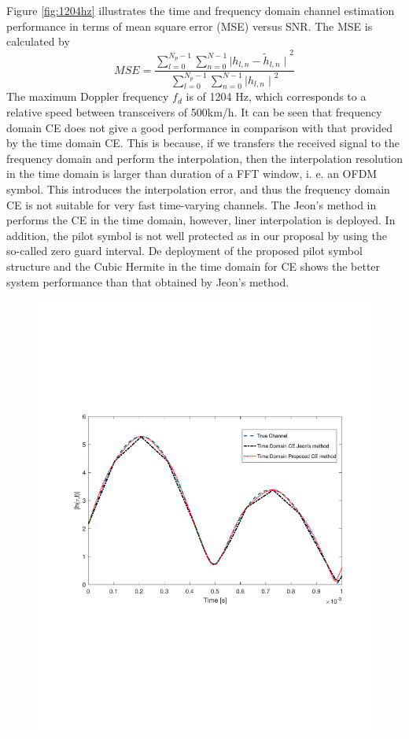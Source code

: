 \documentclass[AMA]{WileyNJD-v1}
\begin{document}
{{{Figure \ref{fig:1204hz} illustrates the time and frequency domain channel estimation performance in terms of mean square error (MSE) versus SNR. The MSE is calculated by
%
\begin{equation}\label{eq:mse-calculate}
MSE=\dfrac{\sum_{l=0}^{N_p-1}\sum_{n=0}^{N-1} {\mid h_{l,n} - \tilde{h}_{l,n}\mid}^{2} }{{\sum_{l=0}^{N_p-1}\sum_{n=0}^{N-1} {\mid h_{l,n}\mid}^{2}}}
\end{equation}
%
The maximum Doppler frequency $f_{d}$ is of 1204 Hz, which corresponds to a relative speed between transceivers of 500km/h. It can be seen that frequency domain CE does not give a good performance in comparison with that provided by the time domain CE. This is because, if we transfers the received signal to the frequency domain and perform the interpolation, then the interpolation resolution in the time domain is larger than duration of a FFT window, i. e. an OFDM symbol. This introduces the interpolation error, and thus the frequency domain CE is not suitable for very fast time-varying channels. The Jeon's method in \cite{Jeon1999} performs the CE in the time domain, however, liner interpolation is deployed. In addition, the pilot symbol is not well protected as in our proposal by using the so-called zero guard interval. De deployment of the proposed pilot symbol structure and the Cubic Hermite in the time domain for CE shows the better system performance than that obtained by Jeon's method.  
%
\begin{figure}
	\centering
	\includegraphics[width=1.0\linewidth]{figures/compare_linear_cubic_org.pdf}

\end{figure}}}}
\end{document}
